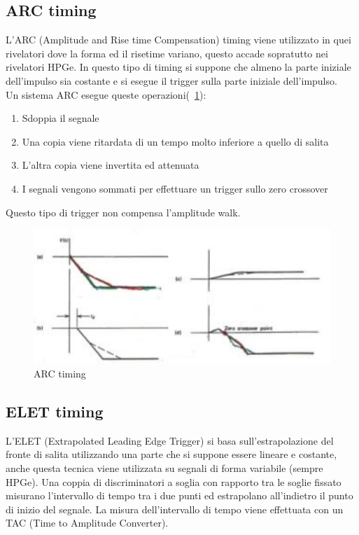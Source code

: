 \subsection{ARC timing}
L'ARC (Amplitude and Rise time Compensation) timing viene utilizzato in quei rivelatori dove la forma ed il risetime variano, questo accade sopratutto nei rivelatori HPGe.
In questo tipo di timing si suppone che almeno la parte iniziale dell'impulso sia costante e si esegue il trigger sulla parte iniziale dell'impulso.\\
Un sistema ARC esegue queste operazioni(~\ref{fig:ARC}):
\begin{enumerate}
\item Sdoppia il segnale
\item Una copia viene ritardata di un tempo molto inferiore a quello di salita
\item L'altra copia viene invertita ed attenuata
\item I segnali vengono sommati per effettuare un trigger sullo zero crossover
\end{enumerate}
Questo tipo di trigger non compensa l'amplitude walk.
\begin{figure}[htbp]
\begin{center}
\includegraphics[scale=1]{./Immagini/ARC.png}
\caption{ARC timing}
\label{fig:ARC}
\end{center}
\end{figure}
\subsection{ELET timing}
L'ELET (Extrapolated Leading Edge Trigger) si basa sull'estrapolazione del fronte di salita utilizzando una parte che si suppone essere lineare e costante,
anche questa tecnica viene utilizzata su segnali di forma variabile (sempre HPGe).
Una coppia di discriminatori a soglia con rapporto tra le soglie fissato misurano l'intervallo di tempo tra i due punti ed estrapolano all'indietro il punto di inizio
del segnale.
La misura dell'intervallo di tempo viene effettuata con un TAC (Time to Amplitude Converter).
